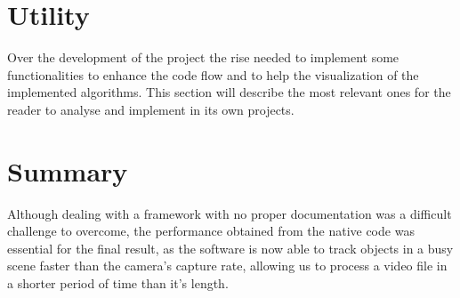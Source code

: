 \section{Utility}

Over the development of the project the rise needed to implement some functionalities to enhance the code flow and to help the visualization of the implemented algorithms. This section will describe the most relevant ones for the reader to analyse and implement in its own projects.



\section{Summary}

Although dealing with a framework with no proper documentation was a difficult challenge to overcome, the performance obtained from the native code was essential for the final result, as the software is now able to track objects in a busy scene faster than the camera's capture rate, allowing us to process a video file in a shorter period of time than it's length.